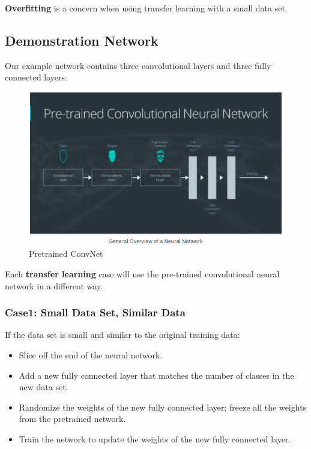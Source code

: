 \documentclass[11pt, a4paper]{article}
\begin{document}
\textbf{Overfitting} is a concern when using transfer learning with a small data set.



\subsection{Demonstration Network}%
\label{ssub:demonstration_network}

Our example network contains three convolutional layers and three fully connected layers:



\begin{figure}[htpb!]
	\centering
	\includegraphics[width=0.8\linewidth]{pretrained_convnet}
	\caption{Pretrained ConvNet}
	\label{fig:pretrained_convnet}
\end{figure}





Each \textbf{transfer learning} case will use the pre-trained convolutional neural network in a different way.



\subsubsection{Case1: Small Data Set, Similar Data}%
\label{ssub:case1_small_data_set_similar_data}


If the data set is small and similar to the original training data:

\begin{itemize}
	\item Slice off the end of the neural network.
	\item Add a new fully connected layer that matches the number of classes in the new data set.
	\item Randomize the weights of the new fully connected layer; freeze all the weights from the pretrained network.
	\item Train the network to update the weights of the new fully connected layer.
\end{itemize}
\end{document}

